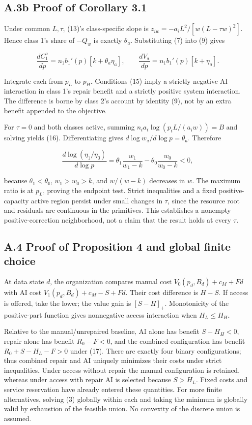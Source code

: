 \documentclass[
  11pt,
  a4paper,
]{article}
\begin{document}
\hypertarget{a.3b-proof-of-corollary-3.1}{%
\subsection{A.3b Proof of Corollary
3.1}\label{a.3b-proof-of-corollary-3.1}}

Under common \(L,\tau\), (13)'s class-specific slope is
\(z_{iw}=-a_i L^2/[w(L-\tau w)^2]\). Hence class 1's share of \(-Q_w\)
is exactly \(\theta_a\). Substituting (7) into (9) gives

\[\frac{dC_1^a}{dp}=n_1 b_1'(p)[k+\theta_a\eta_a],\qquad
\frac{dV_a}{dp}=n_1 b_1'(p)[k+\eta_a].\]

Integrate each from \(p_L\) to \(p_H\). Conditions (15) imply a strictly
negative AI interaction in class 1's repair benefit and a strictly
positive system interaction. The difference is borne by class 2's
account by identity (9), not by an extra benefit appended to the
objective.

For \(\tau=0\) and both classes active, summing
\(n_i a_i\log(p_i L/(a_i w))=B\) and solving yields (16).
Differentiating gives \(d\log w_a/d\log p=\theta_a\). Therefore

\[\frac{d\log(\eta_1/\eta_0)}{d\log p}
=\theta_1\frac{w_1}{w_1-k}-\theta_0\frac{w_0}{w_0-k}<0,\]

because \(\theta_1<\theta_0\), \(w_1>w_0>k\), and \(w/(w-k)\) decreases
in \(w\). The maximum ratio is at \(p_L\), proving the endpoint test.
Strict inequalities and a fixed positive-capacity active region persist
under small changes in \(\tau\), since the resource root and residuals
are continuous in the primitives. This establishes a nonempty
positive-correction neighborhood, not a claim that the result holds at
every \(\tau\).

\hypertarget{a.4-proof-of-proposition-4-and-global-finite-choice}{%
\subsection{A.4 Proof of Proposition 4 and global finite
choice}\label{a.4-proof-of-proposition-4-and-global-finite-choice}}

At data state \(d\), the organization compares manual cost
\(V_0(p_d,B_d)+c_M+Fd\) with AI cost \(V_1(p_d,B_d)+c_M-S+Fd\). Their
cost difference is \(H-S\). If access is offered, take the lower; the
value gain is \([S-H]_+\). Monotonicity of the positive-part function
gives nonnegative access interaction when \(H_L\leq H_H\).

Relative to the manual/unrepaired baseline, AI alone has benefit
\(S-H_H<0\), repair alone has benefit \(R_0-F<0\), and the combined
configuration has benefit \(R_0+S-H_L-F>0\) under (17). There are
exactly four binary configurations; thus combined repair and AI uniquely
minimizes their costs under strict inequalities. Under access without
repair the manual configuration is retained, whereas under access with
repair AI is selected because \(S>H_L\). Fixed costs and service
reservation have already entered these quantities. For more finite
alternatives, solving (3) globally within each and taking the minimum is
globally valid by exhaustion of the feasible union. No convexity of the
discrete union is assumed.
\end{document}
